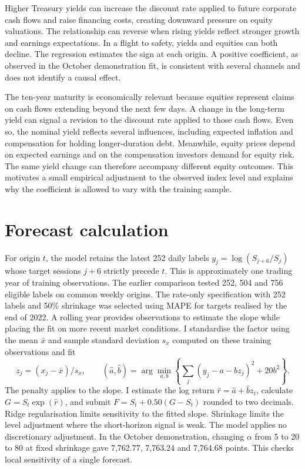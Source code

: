\documentclass[11pt,a4paper]{article}
\begin{document}
Higher Treasury yields can increase the discount rate applied to future corporate cash flows and raise financing costs, creating downward pressure on equity valuations. The relationship can reverse when rising yields reflect stronger growth and earnings expectations. In a flight to safety, yields and equities can both decline. The regression estimates the sign at each origin. A positive coefficient, as observed in the October demonstration fit, is consistent with several channels and does not identify a causal effect.

The ten-year maturity is economically relevant because equities represent claims on cash flows extending beyond the next few days. A change in the long-term yield can signal a revision to the discount rate applied to those cash flows. Even so, the nominal yield reflects several influences, including expected inflation and compensation for holding longer-duration debt. Meanwhile, equity prices depend on expected earnings and on the compensation investors demand for equity risk. The same yield change can therefore accompany different equity outcomes. This motivates a small empirical adjustment to the observed index level and explains why the coefficient is allowed to vary with the training sample.

\section{Forecast calculation}
For origin $t$, the model retains the latest 252 daily labels $y_j=\log(S_{j+6}/S_j)$ whose target sessions $j+6$ strictly precede $t$. This is approximately one trading year of training observations. The earlier comparison tested 252, 504 and 756 eligible labels on common weekly origins. The rate-only specification with 252 labels and 50\% shrinkage was selected using MAPE for targets realised by the end of 2022. A rolling year provides observations to estimate the slope while placing the fit on more recent market conditions. I standardise the factor using the mean $\bar{x}$ and sample standard deviation $s_x$ computed on these training observations and fit
\[
 z_j=(x_j-\bar{x})/s_x,\qquad
 (\hat a,\hat b)=\arg\min_{a,b}\left\{\sum_j(y_j-a-bz_j)^2+20b^2\right\}.
\]
The penalty applies to the slope. I estimate the log return $\hat r=\hat a+\hat b z_t$, calculate $G=S_t\exp(\hat r)$, and submit $F=S_t+0.50(G-S_t)$ rounded to two decimals. Ridge regularisation limits sensitivity to the fitted slope. Shrinkage limits the level adjustment where the short-horizon signal is weak. The model applies no discretionary adjustment. In the October demonstration, changing $\alpha$ from 5 to 20 to 80 at fixed shrinkage gave 7,762.77, 7,763.24 and 7,764.68 points. This checks local sensitivity of a single forecast.
\end{document}
